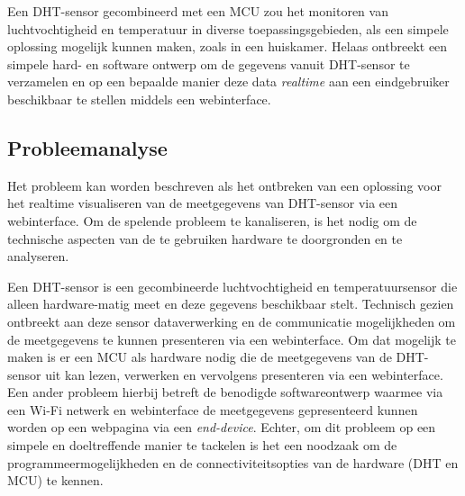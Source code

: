 Een DHT-sensor gecombineerd met een MCU zou het monitoren van luchtvochtigheid en temperatuur in 
diverse toepassingsgebieden, als een simpele oplossing mogelijk kunnen maken, zoals in een huiskamer.  
Helaas ontbreekt een simpele hard- en software ontwerp om de gegevens vanuit DHT-sensor te verzamelen en op een bepaalde manier deze data 
\textit{realtime} aan een eindgebruiker beschikbaar te stellen middels een webinterface. 


\subsection{Probleemanalyse}
Het probleem kan worden beschreven als het ontbreken van een oplossing voor het realtime visualiseren van de meetgegevens van DHT-sensor via een webinterface. 
Om de spelende probleem te kanaliseren, is het nodig om de technische aspecten van de te gebruiken hardware te doorgronden en te analyseren.

Een DHT-sensor is een gecombineerde luchtvochtigheid en temperatuursensor die alleen hardware-matig meet en deze gegevens beschikbaar stelt. 
Technisch gezien ontbreekt aan deze sensor dataverwerking en de communicatie mogelijkheden om de meetgegevens te kunnen presenteren via een webinterface.
Om dat mogelijk te maken is er een MCU als hardware nodig die de meetgegevens van de DHT-sensor uit kan lezen, verwerken en vervolgens presenteren via een webinterface. 
Een ander probleem hierbij betreft de benodigde softwareontwerp waarmee via een Wi-Fi netwerk en webinterface de meetgegevens gepresenteerd kunnen worden op een webpagina via een \textit{end-device}. 
Echter, om dit probleem op een simpele en doeltreffende manier te tackelen is het een noodzaak om de programmeermogelijkheden en de connectiviteitsopties van de hardware (DHT en MCU) te kennen. 
